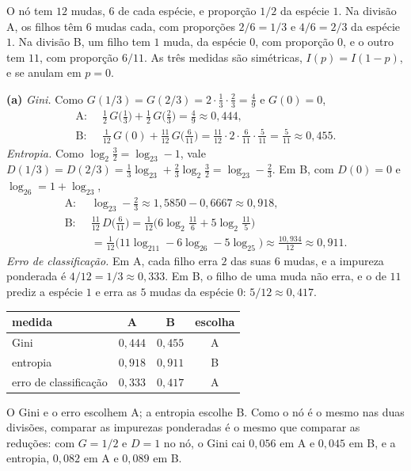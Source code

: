 \begin{solucao}
O nó tem $12$ mudas, $6$ de cada espécie, e proporção $1/2$ da espécie $1$. Na divisão A, os
filhos têm $6$ mudas cada, com proporções $2/6=1/3$ e $4/6=2/3$ da espécie $1$. Na divisão B,
um filho tem $1$ muda, da espécie $0$, com proporção $0$, e o outro tem $11$, com proporção
$6/11$. As três medidas são simétricas, $I(p)=I(1-p)$, e se anulam em $p=0$.

\smallskip
\textbf{(a)} \emph{Gini.} Como $G(1/3)=G(2/3)=2\cdot\tfrac13\cdot\tfrac23=\tfrac49$ e $G(0)=0$,
\begin{align*}
  \text{A: }&\ \tfrac12\,G\big(\tfrac13\big)+\tfrac12\,G\big(\tfrac23\big)=\tfrac49\approx0{,}444,\\
  \text{B: }&\ \tfrac1{12}\,G(0)+\tfrac{11}{12}\,G\big(\tfrac6{11}\big)
  =\tfrac{11}{12}\cdot2\cdot\tfrac6{11}\cdot\tfrac5{11}=\tfrac5{11}\approx0{,}455 .
\end{align*}
\emph{Entropia.} Como $\log_2\tfrac32=\log_23-1$, vale
$D(1/3)=D(2/3)=\tfrac13\log_23+\tfrac23\log_2\tfrac32=\log_23-\tfrac23$. Em B, com $D(0)=0$ e
$\log_26=1+\log_23$,
\begin{align*}
  \text{A: }&\ \log_23-\tfrac23\approx1{,}5850-0{,}6667\approx0{,}918,\\
  \text{B: }&\ \tfrac{11}{12}\,D\big(\tfrac6{11}\big)
  =\tfrac1{12}\Big(6\log_2\tfrac{11}6+5\log_2\tfrac{11}5\Big)\\
  &\ =\tfrac1{12}\big(11\log_211-6\log_26-5\log_25\big)\approx\tfrac{10{,}934}{12}\approx0{,}911 .
\end{align*}
\emph{Erro de classificação.} Em A, cada filho erra $2$ das suas $6$ mudas, e a impureza
ponderada é $4/12=1/3\approx0{,}333$. Em B, o filho de uma muda não erra, e o de $11$ prediz a
espécie $1$ e erra as $5$ mudas da espécie $0$: $5/12\approx0{,}417$.
\begin{center}\small
\renewcommand{\arraystretch}{1.25}
\begin{tabular}{@{}lccc@{}}
\toprule
medida & A & B & escolha \\
\midrule
Gini & $0{,}444$ & $0{,}455$ & A \\
entropia & $0{,}918$ & $0{,}911$ & B \\
erro de classificação & $0{,}333$ & $0{,}417$ & A \\
\bottomrule
\end{tabular}
\end{center}
O Gini e o erro escolhem A; a entropia escolhe B. Como o nó é o mesmo nas duas divisões,
comparar as impurezas ponderadas é o mesmo que comparar as reduções: com $G=1/2$ e $D=1$ no
nó, o Gini cai $0{,}056$ em A e $0{,}045$ em B, e a entropia, $0{,}082$ em A e $0{,}089$ em B.


\end{solucao}
